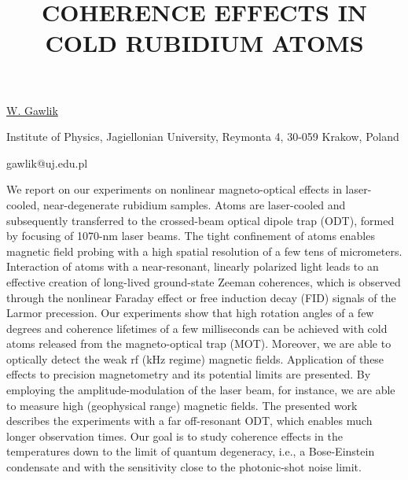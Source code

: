 \title{COHERENCE EFFECTS IN COLD RUBIDIUM ATOMS}

\underline{W. Gawlik} 

{\normalsize{\vspace{-4mm}
Institute of Physics, Jagiellonian University,
Reymonta 4, 30-059 Krakow, Poland

\email gawlik@uj.edu.pl}}

We report on our experiments on nonlinear magneto-optical effects in laser-cooled, near-degenerate rubidium samples. Atoms are laser-cooled and subsequently transferred to the crossed-beam optical dipole trap (ODT), formed by focusing of 1070-nm laser beams. The tight confinement of atoms enables magnetic field probing with a high spatial resolution of a few tens of micrometers.
Interaction of atoms with a near-resonant, linearly polarized light leads to an effective creation of long-lived ground-state Zeeman coherences, which is observed through the nonlinear Faraday effect or free induction decay (FID) signals of the Larmor precession. Our experiments show that high rotation angles of a few degrees and coherence lifetimes of a few milliseconds can be achieved with cold atoms released from the magneto-optical trap (MOT). Moreover, we are able to optically detect the weak rf (kHz regime) magnetic fields.
Application of these effects to precision magnetometry and its potential limits are presented. By employing the amplitude-modulation of the laser beam, for instance, we are able to measure high (geophysical range) magnetic fields.
The presented work describes the experiments with a far off-resonant ODT, which enables much longer observation times. Our goal is to study coherence effects in the temperatures down to the limit of quantum degeneracy, i.e., a Bose-Einstein condensate and with the sensitivity close to the photonic-shot noise limit.

\vspace{\baselineskip}
